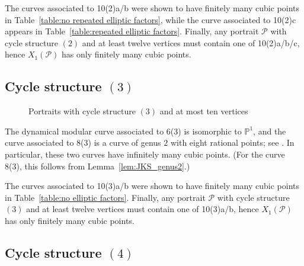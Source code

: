 \documentclass[12pt]{amsart}
\theoremstyle{definition}
\newcommand{\bbP}{\mathbb{P}}
\newcommand{\calP}{\mathcal{P}}
\numberwithin{equation}{section}
\begin{document}
The curves associated to 10(2)a/b were shown to have finitely many cubic points in Table~\ref{table:no repeated elliptic factors}, while the curve associated to 10(2)c appears in Table~\ref{table:repeated elliptic factors}. Finally, any portrait $\calP$ with cycle structure $(2)$ and at least twelve vertices must contain one of 10(2)a/b/c, hence $X_1(\calP)$ has only finitely many cubic points.

\subsection{Cycle structure $(3)$}

\begin{figure}
    \caption{Portraits with cycle structure $(3)$ and at most ten vertices}
    \label{fig:(3)}
\end{figure}

The dynamical modular curve associated to 6(3) is isomorphic to $\bbP^1$, and the curve associated to 8(3) is a curve of genus $2$ with eight rational points; see \cite{poonen:1998}. In particular, these two curves have infinitely many cubic points. (For the curve 8(3), this follows from Lemma~\ref{lem:JKS_genus2}.)

The curves associated to 10(3)a/b were shown to have finitely many cubic points in Table~\ref{table:no elliptic factors}. Finally, any portrait $\calP$ with cycle structure $(3)$ and at least twelve vertices must contain one of 10(3)a/b, hence $X_1(\calP)$ has only finitely many cubic points.

\subsection{Cycle structure $(4)$}
\end{document}

